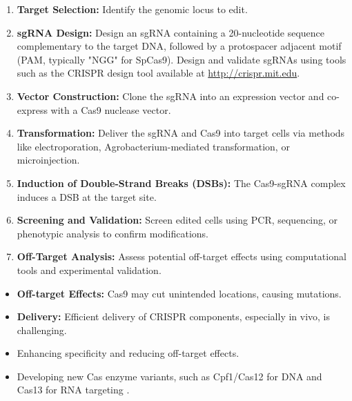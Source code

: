 \documentclass{article}
\newcounter{subsubsubsection}[subsubsection]
\begin{document}
\begin{enumerate}
    \item \textbf{Target Selection:} Identify the genomic locus to edit.
    
    \item \textbf{sgRNA Design:} Design an sgRNA containing a 20-nucleotide sequence complementary to the target DNA, followed by a protospacer adjacent motif (PAM, typically "NGG" for SpCas9). Design and validate sgRNAs using tools such as the CRISPR design tool available at \url{http://crispr.mit.edu}.
    
    \item \textbf{Vector Construction:} Clone the sgRNA into an expression vector and co-express with a Cas9 nuclease vector.
    
    \item \textbf{Transformation:} Deliver the sgRNA and Cas9 into target cells via methods like electroporation, Agrobacterium-mediated transformation, or microinjection.
    
    \item \textbf{Induction of Double-Strand Breaks (DSBs):} The Cas9-sgRNA complex induces a DSB at the target site.
    
    \item \textbf{Screening and Validation:} Screen edited cells using PCR, sequencing, or phenotypic analysis to confirm modifications.
    
    \item \textbf{Off-Target Analysis:} Assess potential off-target effects using computational tools and experimental validation.
    
\end{enumerate}

    \begin{itemize}
        \item \textbf{Off-target Effects:} Cas9 may cut unintended locations, causing mutations.
        \item \textbf{Delivery:} Efficient delivery of CRISPR components, especially in vivo, is challenging.
    \end{itemize}
    
    \begin{itemize}
        \item Enhancing specificity and reducing off-target effects.
        \item Developing new Cas enzyme variants, such as Cpf1/Cas12 for DNA and Cas13 for RNA targeting \cite{aksoy2022general}.
    \end{itemize}
\end{document}
